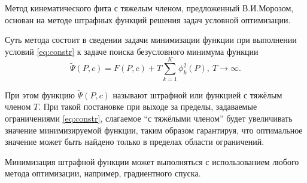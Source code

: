 
%

Метод кинематического фита с тяжелым членом, предложенный В.И.Морозом, основан на методе штрафных функций решения задач условной оптимизации.

Суть метода состоит в сведении задачи минимизации функции \label{track_fit} при выполнении условий \eqref{eq:constr} к задаче поиска безусловного минимума функции
\begin{equation}
 \tilde{\Psi}(P, c) = F(P, c) + T\sum_{k=1}^{K}\phi_k^2(P),~T \rightarrow \infty.
\end{equation}

При этом функцию $ \tilde{\Psi}(P, c)$ называют штрафной или функцией с тяжёлым членом $T$. При такой постановке при выходе за пределы, задаваемые ограничениями \eqref{eq:constr}, слагаемое ``с тяжёлыми членом'' будет увеличивать значение минимизируемой функции, таким образом гарантируя, что оптимальное значение может быть найдено только в пределах области ограничений.

Минимизация штрафной функции может выполняться с использованием любого метода оптимизации, например, градиентного спуска.
